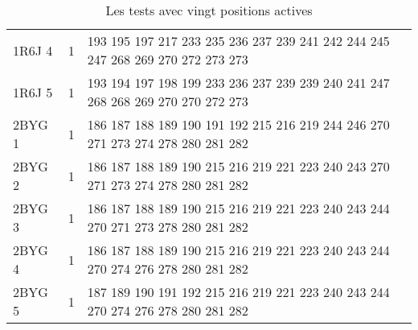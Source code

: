 \begin{table}[!htbp]
{\begin{tabular}{lll}
        1R6J 4 & 1 & 193 195 197 217 233 235 236 237 239 241 242 244 245 247 268 269 270 272 273 273 \\
        1R6J 5 & 1 & 193 194 197 198 199 233 236 237 239 239 240 241 247 268 268 269 270 270 272 273 \\
        2BYG 1 & 1 & 186 187 188 189 190 191 192 215 216 219 244 246 270 271 273 274 278 280 281 282 \\
        2BYG 2 & 1 & 186 187 188 189 190 215 216 219 221 223 240 243 270 271 273 274 278 280 281 282 \\
        2BYG 3 & 1 & 186 187 188 189 190 215 216 219 221 223 240 243 244 270 271 273 278 280 281 282 \\
        2BYG 4 & 1 & 186 187 188 189 190 215 216 219 221 223 240 243 244 270 274 276 278 280 281 282 \\
        2BYG 5 & 1 & 187 189 190 191 192 215 216 219 221 223 240 243 244 270 274 276 278 280 281 282 \\

        \bottomrule

      \end{tabular}
}      
      \caption{Les tests avec vingt positions actives}
\label{tab:test20}      
    \end{table}


